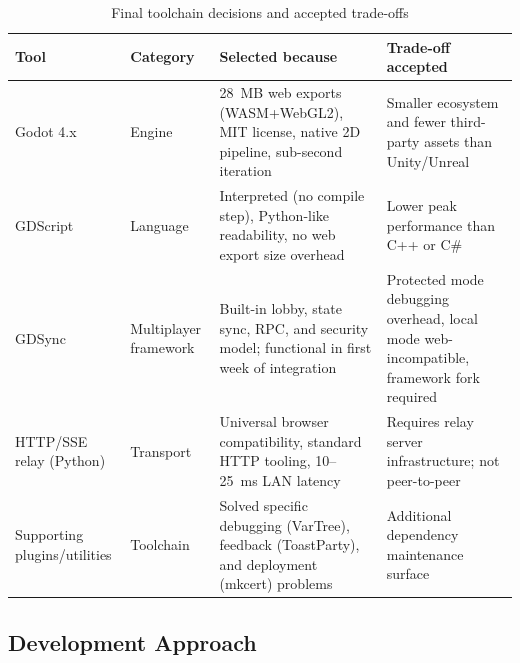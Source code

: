 \begin{table}[htbp]
    \centering
    \caption{Final toolchain decisions and accepted trade-offs}
    \label{tab:toolchain-summary}
    \begin{tabular}{@{}p{2.8cm}p{2.6cm}p{4.5cm}p{4cm}@{}}
        \toprule
        \textbf{Tool}                & \textbf{Category}     & \textbf{Selected because}                                                                    & \textbf{Trade-off accepted}                                                             \\
        \midrule
        Godot 4.x                    & Engine                & 28~MB web exports (WASM+WebGL2), MIT license, native 2D pipeline, sub-second iteration       & Smaller ecosystem and fewer third-party assets than Unity/Unreal                        \\
        \midrule
        GDScript                     & Language              & Interpreted (no compile step), Python-like readability, no web export size overhead          & Lower peak performance than C++ or C\#                                                  \\
        \midrule
        GDSync                       & Multiplayer framework & Built-in lobby, state sync, RPC, and security model; functional in first week of integration & Protected mode debugging overhead, local mode web-incompatible, framework fork required \\
        \midrule
        HTTP/SSE relay (Python)      & Transport             & Universal browser compatibility, standard HTTP tooling, 10--25~ms LAN latency                & Requires relay server infrastructure; not peer-to-peer                                  \\
        \midrule
        Supporting plugins/utilities & Toolchain             & Solved specific debugging (VarTree), feedback (ToastParty), and deployment (mkcert) problems & Additional dependency maintenance surface                                               \\
        \bottomrule
    \end{tabular}
\end{table}

\subsection{Development Approach}
\label{subsec:development-approach}

